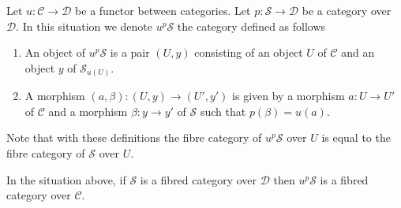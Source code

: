 \medskip\noindent
Let $u : \mathcal{C} \to \mathcal{D}$ be a functor between categories.
Let $p : \mathcal{S} \to \mathcal{D}$ be a category over $\mathcal{D}$.
In this situation we denote $u^p\mathcal{S}$ the category defined
as follows
\begin{enumerate}
\item An object of $u^p\mathcal{S}$ is a pair $(U, y)$ consisting
of an object $U$ of $\mathcal{C}$ and an object $y$ of $\mathcal{S}_{u(U)}$.
\item A morphism $(a, \beta) : (U, y) \to (U', y')$ is given by
a morphism $a : U \to U'$ of $\mathcal{C}$ and a morphism $\beta : y \to y'$
of $\mathcal{S}$ such that $p(\beta) = u(a)$.
\end{enumerate}
Note that with these definitions the fibre category of
$u^p\mathcal{S}$ over $U$ is equal to the fibre category of
$\mathcal{S}$ over $U$.

\begin{lemma}
\label{lemma-fibred-category-pushforward}
In the situation above, if $\mathcal{S}$ is a fibred category over
$\mathcal{D}$ then $u^p\mathcal{S}$ is a fibred category over $\mathcal{C}$.
\end{lemma}

